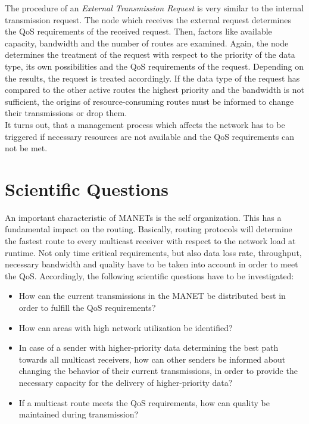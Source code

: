 \documentclass[conference]{IEEEtran}
\newcommand{\MANET}{MANET}
\newcommand{\QOS}{QoS}
\begin{document}
	The procedure of an \textit{External Transmission Request} is very similar to the internal transmission request. The node which receives the external request determines the \QOS{} requirements of the received request. Then, factors like available capacity, bandwidth and the number of routes are examined. Again, the node determines the treatment of the request with respect to the priority of the data type, its own possibilities and the \QOS{} requirements of the request. Depending on the results, the request is treated accordingly. If the data type of the request has compared to the other active routes the highest priority and the bandwidth is not sufficient, the origins of resource-consuming routes must be informed to change their transmissions or drop them.\\
	It turns out, that a  management process which affects the network has to be triggered if necessary resources are not available and the \QOS{} requirements can not be met.
	
	\section{Scientific Questions}
	An important characteristic of \MANET{s} is the self organization. This has a fundamental impact on the routing. Basically, routing protocols will determine the fastest route to every multicast receiver with respect to the network load at runtime. Not only time critical requirements, but also data loss rate, throughput, necessary bandwidth and quality have to be taken into account in order to meet the \QOS{}. Accordingly, the following scientific questions have to be investigated:
	\begin{itemize}
		\item How can the current transmissions in the \MANET{} be distributed best in order to fulfill the \QOS{} requirements? 
		\item How can areas with high network utilization be identified?
		\item In case of a sender with higher-priority data determining the best path towards all multicast receivers, how can other senders be informed about changing the behavior of their current transmissions, in order to provide the necessary capacity for the delivery of higher-priority data?
		\item If a multicast route meets the \QOS{} requirements, how can quality be maintained during transmission?
	\end{itemize}
\end{document}
